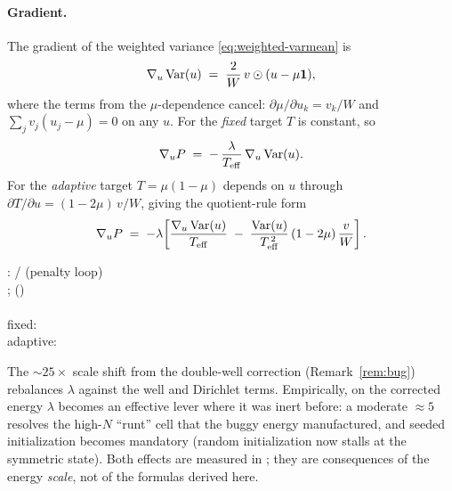 \documentclass[11pt,a4paper]{article}
\begin{document}
\paragraph{Gradient.}
The gradient of the weighted variance \eqref{eq:weighted-varmean} is
\begin{equation}
  \nabla_u \operatorname{Var}(u) \;=\; \frac{2}{W}\,v\odot(u - \mu\mathbf 1),
  \label{eq:grad-var}
\end{equation}
where the terms from the $\mu$-dependence cancel: $\partial\mu/\partial u_k = v_k/W$
and $\sum_j v_j (u_j-\mu)=0$ on any $u$. For the \emph{fixed} target $T$ is constant,
so
\begin{equation}
  \nabla_u P \;=\; -\,\frac{\lambda}{T_{\mathrm{eff}}}\,\nabla_u \operatorname{Var}(u).
  \label{eq:grad-penalty-fixed}
\end{equation}
For the \emph{adaptive} target $T=\mu(1-\mu)$ depends on $u$ through
$\partial T/\partial u = (1-2\mu)\,v/W$, giving the quotient-rule form
\begin{equation}
  \nabla_u P \;=\; -\lambda\!\left[
    \frac{\nabla_u \operatorname{Var}(u)}{T_{\mathrm{eff}}}
    \;-\;
    \frac{\operatorname{Var}(u)}{T_{\mathrm{eff}}^{\,2}}\,(1-2\mu)\,\frac{v}{W}
  \right].
  \label{eq:grad-penalty-adaptive}
\end{equation}

\begin{tcolorbox}[colback=blue!4!white, colframe=blue!40!black,
                  title={Code: crispness penalty and gradient}, fontupper=\small]
:
 /  (penalty loop)\\[2pt]
;\quad
{}\hfill\textrm{\small()}\\
\\
fixed:\ \ \\
adaptive:\ \ 
\end{tcolorbox}

\begin{remark}
The $\sim\!25\times$ scale shift from the double-well correction
(Remark~\ref{rem:bug}) rebalances $\lambda$ against the well and Dirichlet terms.
Empirically, on the corrected energy $\lambda$ becomes an effective lever where it was
inert before: a moderate $\approx 5$ resolves the high-$N$
``runt'' cell that the buggy energy manufactured, and seeded initialization becomes
mandatory (random initialization now stalls at the symmetric state). Both effects are
measured in ; they are
consequences of the energy \emph{scale}, not of the formulas derived here.
\end{remark}
\end{document}
